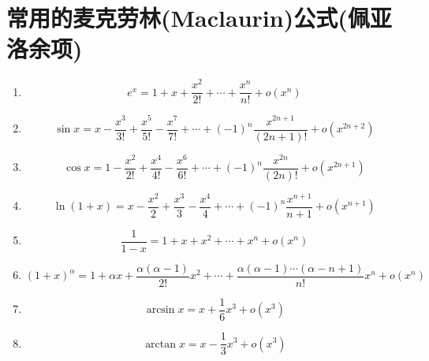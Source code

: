 \chapter{常用的麦克劳林(Maclaurin)公式(佩亚洛余项)}
\begin{enumerate}
	\item \[ e^{x} = 1 + x + \dfrac{x^{2}}{2!} + \cdots + \dfrac{x^{n}}{n!} + o(x^{n}) \]
	\item \[ \sin x = x - \dfrac{x^{3}}{3!} + \dfrac{x^{5}}{5!} - \dfrac{x^{7}}{7!} + \cdots + (-1)^{n}\dfrac{x^{2n + 1}}{(2n + 1)!} + o(x^{2n + 2}) \]
	\item \[ \cos x = 1 - \dfrac{x^{2}}{2!} + \dfrac{x^{4}}{4!} - \dfrac{x^{6}}{6!} + \cdots + (-1)^{n}\dfrac{x^{2n}}{(2n)!} + o(x^{2n + 1}) \]
	\item \[ \ln(1 + x) = x - \dfrac{x^{2}}{2} + \dfrac{x^{3}}{3} - \dfrac{x^{4}}{4} + \cdots + (-1)^{n}\dfrac{x^{n + 1}}{n + 1} + o(x^{n + 1}) \]
	\item \[ \dfrac{1}{1 - x} = 1 + x + x^{2} + \cdots +x^{n} + o(x^{n}) \]
	\item \[ (1 + x)^{\alpha} = 1 + \alpha x + \dfrac{\alpha(\alpha - 1)}{2!}x^{2} + \cdots + \dfrac{\alpha(\alpha - 1)\cdots(\alpha - n + 1)}{n!}x^{n} + o(x^{n}) \]
	\item \[ \arcsin x = x + \dfrac{1}{6}x^{3} + o(x^{3}) \]
	\item \[ \arctan x = x - \dfrac{1}{3}x^{3} + o(x^{3}) \]
\end{enumerate}